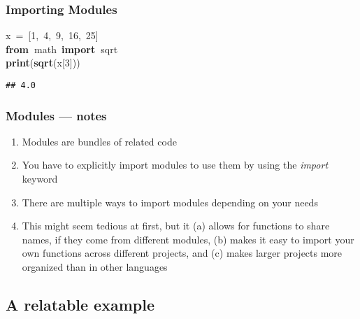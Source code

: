 \documentclass{beamer}\usepackage[]{graphicx}\usepackage[]{color}
\makeatletter
\newcommand{\hlnum}[1]{\textcolor[rgb]{0.686,0.059,0.569}{#1}}%
\newcommand{\hlopt}[1]{\textcolor[rgb]{0,0,0}{#1}}%
\newcommand{\hlstd}[1]{\textcolor[rgb]{0.345,0.345,0.345}{#1}}%
\newcommand{\hlkwa}[1]{\textcolor[rgb]{0.161,0.373,0.58}{\textbf{#1}}}%
\newcommand{\hlkwd}[1]{\textcolor[rgb]{0.737,0.353,0.396}{\textbf{#1}}}%
\newenvironment{kframe}{%
 \def\at@end@of@kframe{}%
 \ifinner\ifhmode%
  \def\at@end@of@kframe{\end{minipage}}%
  \begin{minipage}{\columnwidth}%
 \fi\fi%
 \def\FrameCommand##1{\hskip\@totalleftmargin \hskip-\fboxsep
 \colorbox{shadecolor}{##1}\hskip-\fboxsep
     \hskip-\linewidth \hskip-\@totalleftmargin \hskip\columnwidth}%
 \MakeFramed {\advance\hsize-\width
   \@totalleftmargin\z@ \linewidth\hsize
   \@setminipage}}%
 {\par\unskip\endMakeFramed%
 \at@end@of@kframe}
\newenvironment{knitrout}{}{} %
\makeatother
\begin{document}
\begin{frame}[fragile]
\frametitle{Importing Modules}
\begin{knitrout}
\color{fgcolor}\begin{kframe}
\noindent
\ttfamily
\hlstd{x\ }\hlopt{=\ {[}}\hlstd{}\hlnum{1}\hlstd{}\hlopt{,\ }\hlstd{}\hlnum{4}\hlstd{}\hlopt{,\ }\hlstd{}\hlnum{9}\hlstd{}\hlopt{,\ }\hlstd{}\hlnum{16}\hlstd{}\hlopt{,\ }\hlstd{}\hlnum{25}\hlstd{}\hlopt{{]}}\hspace*{\fill}\\
\hlstd{}\hlkwa{from\ }\hlstd{math\ }\hlkwa{import\ }\hlstd{sqrt\ }\hspace*{\fill}\\
\hlstd{}\hlkwa{print}\hlstd{}\hlopt{(}\hlstd{}\hlkwd{sqrt}\hlstd{}\hlopt{(}\hlstd{x}\hlopt{{[}}\hlstd{}\hlnum{3}\hlstd{}\hlopt{{]}))}\hlstd{}\hspace*{\fill}
\mbox{}
\normalfont

\begin{verbatim}
## 4.0
\end{verbatim}
\end{kframe}
\end{knitrout}
\end{frame}

\begin{frame}
\frametitle{Modules --- notes}
	\begin{enumerate}
		\item Modules are bundles of related code

		\item You have to explicitly import modules to use them by using the \emph{import} keyword

		\item There are multiple ways to import modules depending on your needs

		\item This might seem tedious at first, but it (a) allows for functions to share names, if they come from different modules, (b) makes it easy to import your own functions across different projects, and (c) makes larger projects more organized than in other languages 
	\end{enumerate}
\end{frame}

\subsection{A relatable example}
\end{document}
